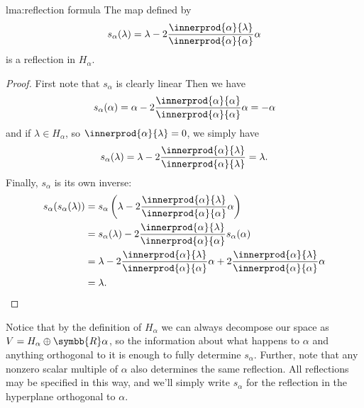 \documentclass[fleqn, a4paper, openany]{memoir}
\newcommand{\reals}{\symbb{R}}
\begin{document}
    \begin{lma}{}{lma:reflection formula}
        The map defined by
        \begin{equation}
            s_\alpha(\lambda) = \lambda - 2\frac{\innerprod{\alpha}{\lambda}}{\innerprod{\alpha}{\alpha}} \alpha
        \end{equation}
        is a reflection in \(H_\alpha\).
        \begin{proof}
            First note that \(s_\alpha\) is clearly linear
            Then we have
            \begin{equation}
                s_\alpha(\alpha) = \alpha - 2\frac{\innerprod{\alpha}{\alpha}}{\innerprod{\alpha}{\alpha}} \alpha = -\alpha
            \end{equation}
            and if \(\lambda \in H_\alpha\), so \(\innerprod{\alpha}{\lambda} = 0\), we simply have
            \begin{equation}
                s_\alpha(\lambda) = \lambda - 2\frac{\innerprod{\alpha}{\lambda}}{\innerprod{\alpha}{\lambda}} = \lambda.
            \end{equation}
            Finally, \(s_\alpha\) is its own inverse:
            \begin{align}
                s_\alpha(s_\alpha(\lambda)) &= s_\alpha\left( \lambda - 2\frac{\innerprod{\alpha}{\lambda}}{\innerprod{\alpha}{\alpha}}\alpha \right)\\
                &= s_\alpha(\lambda) - 2\frac{\innerprod{\alpha}{\lambda}}{\innerprod{\alpha}{\alpha}}s_\alpha(\alpha)\\
                &= \lambda - 2\frac{\innerprod{\alpha}{\lambda}}{\innerprod{\alpha}{\alpha}}\alpha + 2\frac{\innerprod{\alpha}{\lambda}}{\innerprod{\alpha}{\alpha}}\alpha\\
                &= \lambda. \notag \qedhere
            \end{align}
        \end{proof}
    \end{lma}
    
    Notice that by the definition of \(H_\alpha\) we can always decompose our space as \(V = H_\alpha \oplus \reals \alpha\), so the information about what happens to \(\alpha\) and anything orthogonal to it is enough to fully determine \(s_\alpha\).
    Further, note that any nonzero scalar multiple of \(\alpha\) also determines the same reflection.
    All reflections may be specified in this way, and we'll simply write \(s_\alpha\) for the reflection in the hyperplane orthogonal to \(\alpha\).
    
\end{document}
